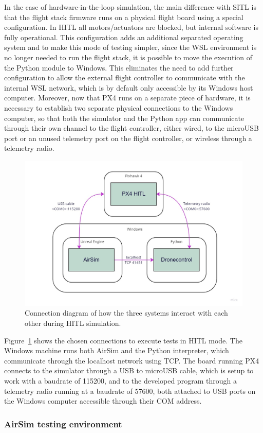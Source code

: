 In the case of hardware-in-the-loop simulation, the main difference with SITL is that the flight stack firmware runs on a physical flight board using a special configuration.
In HITL all motors/actuators are blocked, but internal software is fully operational.
This configuration adds an additional separated operating system and to make this mode of testing simpler, since the WSL environment is no longer needed to run the flight stack, it is possible to move the execution of the Python module to Windows.
This eliminates the need to add further configuration to allow the external flight controller to communicate with the internal WSL network, which is by default only accessible by its Windows host computer.
Moreover, now that PX4 runs on a separate piece of hardware, it is necessary to establish two separate physical connections to the Windows computer, so that both the simulator and the Python app can communicate through their own channel to the flight controller, either wired, to the microUSB port or an unused telemetry port on the flight controller, or wireless through a telemetry radio.

\begin{figure}
  \centering
  \includegraphics[width=\textwidth,keepaspectratio]{img/hitl-connections.jpg}
  \caption{Connection diagram of how the three systems interact with each other during HITL simulation.}\label{fig:hitl-connections}
\end{figure}
Figure~\ref{fig:hitl-connections} shows the chosen connections to execute tests in HITL mode.
The Windows machine runs both AirSim and the Python interpreter, which communicate through the localhost network using TCP.
The board running PX4 connects to the simulator through a USB to microUSB cable, which is setup to work with a baudrate of 115200, and to the developed program through a telemetry radio running at a baudrate of 57600, both attached to USB ports on the Windows computer accessible through their COM address.

\subsubsection{AirSim testing environment}
